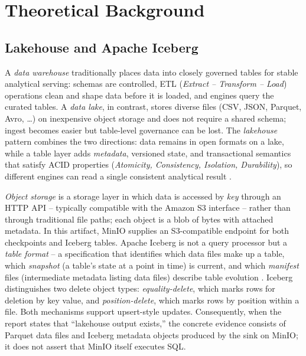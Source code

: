 \section{Theoretical Background}\label{sec:background}

\subsection{Lakehouse and Apache Iceberg}
A \emph{data warehouse} traditionally places data into closely governed tables for stable analytical serving: schemas are controlled, ETL (\emph{Extract -- Transform -- Load}) operations clean and shape data before it is loaded, and engines query the curated tables. A \emph{data lake}, in contrast, stores diverse files (CSV, JSON, Parquet, Avro, \dots) on inexpensive object storage and does not require a shared schema; ingest becomes easier but table-level governance can be lost. The \emph{lakehouse} pattern combines the two directions: data remains in open formats on a lake, while a table layer adds \emph{metadata}, versioned state, and transactional semantics that satisfy ACID properties (\emph{Atomicity, Consistency, Isolation, Durability}), so different engines can read a single consistent analytical result \parencite{armbrust2021lakehouse}.

\emph{Object storage} is a storage layer in which data is accessed by \emph{key} through an HTTP API -- typically compatible with the Amazon S3 interface -- rather than through traditional file paths; each object is a blob of bytes with attached metadata. In this artifact, MinIO supplies an S3-compatible endpoint for both checkpoints and Iceberg tables. Apache Iceberg is not a query processor but a \emph{table format} -- a specification that identifies which data files make up a table, which \emph{snapshot} (a table's state at a point in time) is current, and which \emph{manifest} files (intermediate metadata listing data files) describe table evolution \parencite{icebergdocs}. Iceberg distinguishes two delete object types: \emph{equality-delete}, which marks rows for deletion by key value, and \emph{position-delete}, which marks rows by position within a file. Both mechanisms support upsert-style updates. Consequently, when the report states that ``lakehouse output exists,'' the concrete evidence consists of Parquet data files and Iceberg metadata objects produced by the sink on MinIO; it does not assert that MinIO itself executes SQL.

